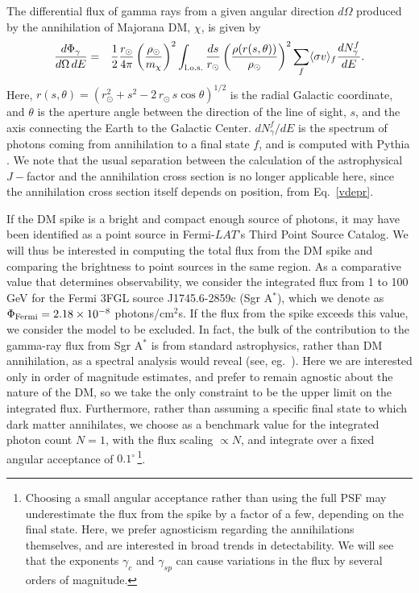 \documentclass[11pt]{article}
\newcommand{\bea}{\begin{eqnarray}}
\newcommand{\eea}{\end{eqnarray}}
\begin{document}
The differential flux of gamma rays from a given angular direction $d\Omega$ produced by the annihilation of Majorana DM, $\chi$, is given by
%
\bea
\label{gammaflux}
\frac{d \Phi_\gamma}{d\Omega\,dE} &=& \frac{1}{2}\frac{r_\odot}{4\pi} \left(\frac{\rho_\odot}{m_{\chi}}\right)^2   \int_{\rm l.o.s.} \frac{ds}{r_\odot} \left(\frac{\rho(r(s,\theta))}{\rho_\odot}\right)^2 \sum _f\langle \sigma v\rangle_f \frac{dN_\gamma^f}{dE}.
\eea
%
Here, $r(s,\theta)=(r_\odot^2+s^2-2\,r_\odot\,s\cos\theta)^{1/2}$ is the radial Galactic coordinate, and $\theta$ is the aperture angle between the direction of the line of sight, $s$, and the axis connecting the Earth to the Galactic Center. $dN_\gamma^f/dE$ is the spectrum of photons coming from annihilation to a final state $f$, and is computed with Pythia \cite{Sjostrand:2006za}. We note that the usual separation between the calculation of the astrophysical $J-$factor and the annihilation cross section is no longer applicable here, since the annihilation cross section itself depends on position, from Eq.~\ref{vdepr}.  

If the DM spike is a bright and compact enough source of photons, it may have been identified as a point source in Fermi-$LAT$'s Third Point Source Catalog. We will thus be interested in computing the total flux from the DM spike and comparing the brightness to point sources in the same region. As a comparative value that determines observability, we consider the integrated flux from 1 to 100 GeV for the Fermi 3FGL source J1745.6-2859c (Sgr A$^*$), which we denote as $\Phi_{\rm Fermi} = 2.18 \times 10^{-8}$ photons/cm$^2$s. If the flux from the spike exceeds this value, we consider the model to be excluded.  In fact, the bulk of the contribution to the gamma-ray flux from Sgr A$^*$ is from standard astrophysics, rather than DM annihilation, as a spectral analysis would reveal (see, eg.~\cite{Abazajian:2014fta}).  Here we are interested only in order of magnitude estimates, and prefer to remain agnostic about the nature of the DM, so we take the only constraint to be the upper limit on the integrated flux.  Furthermore, rather than assuming a specific final state to which dark matter annihilates, we choose as a benchmark value for the integrated photon count $N=1$, with the flux scaling $\propto N$, and integrate over a fixed angular acceptance of $0.1^\circ$\,\footnote{Choosing a small angular acceptance rather than using the full PSF may underestimate the flux from the spike by a factor of a few, depending on the final state.  Here, we prefer agnosticism regarding the annihilations themselves, and are interested in broad trends in detectability. We will see that the exponents $\gamma_c$ and $\gamma_{sp}$ can cause variations in the flux by several orders of magnitude.}.
\end{document}
